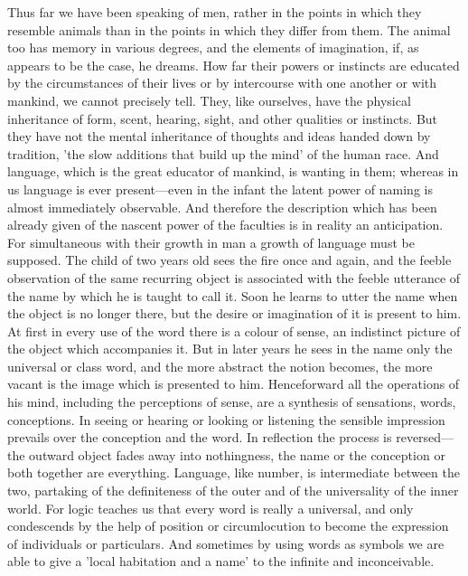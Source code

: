 \documentclass[11pt,letter]{article}
\begin{document}
\par  Thus far we have been speaking of men, rather in the points in which they resemble animals than in the points in which they differ from them. The animal too has memory in various degrees, and the elements of imagination, if, as appears to be the case, he dreams. How far their powers or instincts are educated by the circumstances of their lives or by intercourse with one another or with mankind, we cannot precisely tell. They, like ourselves, have the physical inheritance of form, scent, hearing, sight, and other qualities or instincts. But they have not the mental inheritance of thoughts and ideas handed down by tradition, 'the slow additions that build up the mind' of the human race. And language, which is the great educator of mankind, is wanting in them; whereas in us language is ever present—even in the infant the latent power of naming is almost immediately observable. And therefore the description which has been already given of the nascent power of the faculties is in reality an anticipation. For simultaneous with their growth in man a growth of language must be supposed. The child of two years old sees the fire once and again, and the feeble observation of the same recurring object is associated with the feeble utterance of the name by which he is taught to call it. Soon he learns to utter the name when the object is no longer there, but the desire or imagination of it is present to him. At first in every use of the word there is a colour of sense, an indistinct picture of the object which accompanies it. But in later years he sees in the name only the universal or class word, and the more abstract the notion becomes, the more vacant is the image which is presented to him. Henceforward all the operations of his mind, including the perceptions of sense, are a synthesis of sensations, words, conceptions. In seeing or hearing or looking or listening the sensible impression prevails over the conception and the word. In reflection the process is reversed—the outward object fades away into nothingness, the name or the conception or both together are everything. Language, like number, is intermediate between the two, partaking of the definiteness of the outer and of the universality of the inner world. For logic teaches us that every word is really a universal, and only condescends by the help of position or circumlocution to become the expression of individuals or particulars. And sometimes by using words as symbols we are able to give a 'local habitation and a name' to the infinite and inconceivable.
\end{document}
